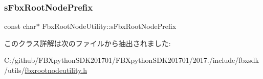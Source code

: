 \subsubsection{\texorpdfstring{s\+Fbx\+Root\+Node\+Prefix}{sFbxRootNodePrefix}}
{\footnotesize\ttfamily const char$\ast$ Fbx\+Root\+Node\+Utility\+::s\+Fbx\+Root\+Node\+Prefix\hspace{0.3cm}{\ttfamily [static]}}



このクラス詳解は次のファイルから抽出されました\+:\begin{DoxyCompactItemize}
\item 
C\+:/github/\+F\+B\+Xpython\+S\+D\+K201701/\+F\+B\+Xpython\+S\+D\+K201701/2017./include/fbxsdk/utils/\hyperlink{fbxrootnodeutility_8h}{fbxrootnodeutility.\+h}\end{DoxyCompactItemize}
